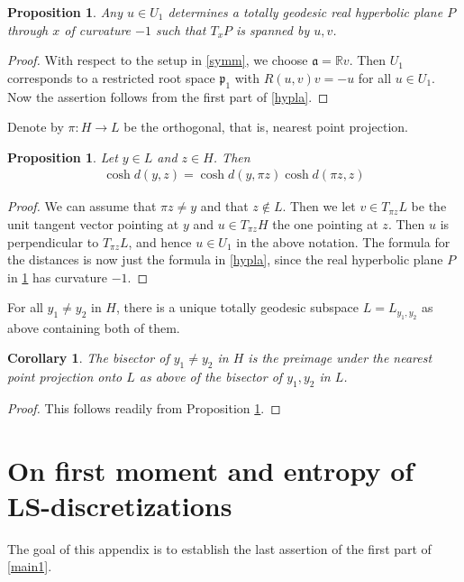 \documentclass[12pt,a4paper]{amsart}
\numberwithin{equation}{section}
\newtheorem{cor}[equation]{Corollary}
\newtheorem{prop}[equation]{Proposition}
\theoremstyle{definition}
\def\R{\mathbb R}
\begin{document}
\begin{prop}\label{hypla2}
Any $u\in U_1$ determines a totally geodesic real hyperbolic plane $P$ through $x$ of curvature $-1$ such that $T_xP$ is spanned by $u,v$.
\end{prop}

\begin{proof}
With respect to the setup in \cref{symm}, we choose $\mathfrak a=\R v$.
Then $U_1$ corresponds to a restricted root space $\mathfrak p_1$ with $R(u,v)v=-u$ for all $u\in U_1$.
Now the assertion follows from the first part of \cref{hypla}.
\end{proof}

Denote by $\pi\colon H\to L$ be the orthogonal, that is, nearest point projection.

\begin{prop}\label{hypla4}
Let $y\in L$ and $z\in H$. Then
\begin{align*}
    \cosh d(y,z) = \cosh d(y,\pi z)\cosh d(\pi z,z)
\end{align*}
\end{prop}

\begin{proof}
We can assume that $\pi z\ne y$ and that $z\notin L$.
Then we let $v\in T_{\pi z}L$ be the unit tangent vector pointing at $y$ and $u\in T_{\pi z}H$ the one pointing at $z$.
Then $u$ is perpendicular to $T_{\pi z}L$, and hence $u\in U_1$ in the above notation.
The formula for the distances is now just the formula in \cref{hypla},
since the real hyperbolic plane $P$ in \cref{hypla2} has curvature $-1$.
\end{proof}

For all $y_1\ne y_2$ in $H$, there is a unique totally geodesic subspace $L=L_{y_1,y_2}$ as above containing both of them.

\begin{cor}\label{bisec2}
The bisector of $y_1\ne y_2$ in $H$ is the preimage under the nearest point projection onto $L$ as above of the bisector of $y_1,y_2$ in $L$.
\end{cor}

\begin{proof}
This follows readily from Proposition \ref{hypla4}.
\end{proof}

\section{On first moment and entropy of LS-discretizations}\label{subm} 
The goal of this appendix is to establish the last assertion of the first part of \cref{main1}.
\end{document}
